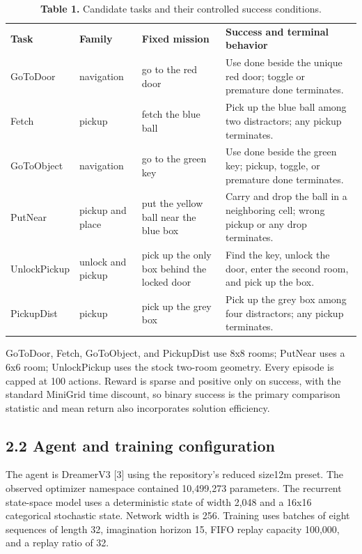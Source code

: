 \documentclass[10pt,a4paper]{article}
\newcommand{\reportsubsection}[1]{\subsection{\textcolor{brandblue}{#1}}}
\begin{document}
\begin{table}[H]
\centering
\begingroup
\footnotesize
\setlength{\tabcolsep}{3.5pt}
\renewcommand{\arraystretch}{1.15}
\begin{tabularx}{\textwidth}{@{} >{\hsize=0.444\hsize\RaggedRight\arraybackslash}X >{\hsize=0.585\hsize\RaggedRight\arraybackslash}X >{\hsize=0.943\hsize\RaggedRight\arraybackslash}X >{\hsize=2.027\hsize\RaggedRight\arraybackslash}X @{}}
\rowcolor{brandblue}
\color{white}\textbf{Task} & \color{white}\textbf{Family} & \color{white}\textbf{Fixed mission} & \color{white}\textbf{Success and terminal behavior} \\
GoToDoor & navigation & go to the red door & Use done beside the unique red door; toggle or premature done terminates. \\
\rowcolor{rowgray}
Fetch & pickup & fetch the blue ball & Pick up the blue ball among two distractors; any pickup terminates. \\
GoToObject & navigation & go to the green key & Use done beside the green key; pickup, toggle, or premature done terminates. \\
\rowcolor{rowgray}
PutNear & pickup and place & put the yellow ball near the blue box & Carry and drop the ball in a neighboring cell; wrong pickup or any drop terminates. \\
UnlockPickup & unlock and pickup & pick up the only box behind the locked door & Find the key, unlock the door, enter the second room, and pick up the box. \\
\rowcolor{rowgray}
PickupDist & pickup & pick up the grey box & Pick up the grey box among four distractors; any pickup terminates. \\
\bottomrule
\end{tabularx}
\endgroup
\caption*{\textbf{Table 1.} Candidate tasks and their controlled success conditions.}
\end{table}
GoToDoor, Fetch, GoToObject, and PickupDist use 8x8 rooms; PutNear uses a 6x6 room; UnlockPickup uses the stock two-room geometry. Every episode is capped at 100 actions. Reward is sparse and positive only on success, with the standard MiniGrid time discount, so binary success is the primary comparison statistic and mean return also incorporates solution efficiency.

\reportsubsection{2.2 Agent and training configuration}
The agent is DreamerV3 [3] using the repository's reduced size12m preset. The observed optimizer namespace contained 10,499,273 parameters. The recurrent state-space model uses a deterministic state of width 2,048 and a 16x16 categorical stochastic state. Network width is 256. Training uses batches of eight sequences of length 32, imagination horizon 15, FIFO replay capacity 100,000, and a replay ratio of 32.
\end{document}
